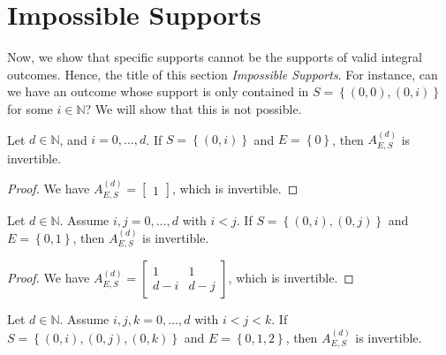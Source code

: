 \section{Impossible Supports}

Now, we show that specific supports cannot be the supports of valid integral outcomes. Hence, the title of this section \emph{Impossible Supports}. For instance, can we have an outcome whose support is only contained in \( S = \left\{ (0,0), (0,i) \right\} \) for some \( i \in \mathbb{N} \)? We will show that this is not possible.



\begin{proposition}
    Let \( d \in \mathbb{N} \), and \( i=0, \dots, d \). If \( S = \left\{ (0,i) \right\} \) and \( E = \left\{ 0 \right\} \), then \( A^{(d)}_{E,S} \) is invertible.
\end{proposition}

\begin{proof}
    We have \( A^{(d)}_{E,S} = \begin{bmatrix}
        1
    \end{bmatrix} \), which is invertible.
\end{proof}

\begin{proposition}
    Let \( d \in \mathbb{N} \). Assume \( i,j=0, \dots, d \) with \( i < j \). If \( S = \left\{ (0,i), (0,j) \right\} \) and \( E = \left\{ 0,1 \right\} \), then \( A^{(d)}_{E,S} \) is invertible.
\end{proposition}

\begin{proof}
    We have \( A^{(d)}_{E,S} = \begin{bmatrix}
        1 & 1 \\ d-i & d-j
    \end{bmatrix} \), which is invertible.
\end{proof}

\begin{proposition}\label{prop:impossible-support-2}
    Let \( d \in \mathbb{N} \). Assume \( i,j,k=0, \dots, d \) with \( i < j < k \). If \( S = \left\{ (0,i), (0,j), (0,k) \right\} \) and \( E = \left\{ 0,1,2 \right\} \), then \( A^{(d)}_{E,S} \) is invertible.
\end{proposition}

